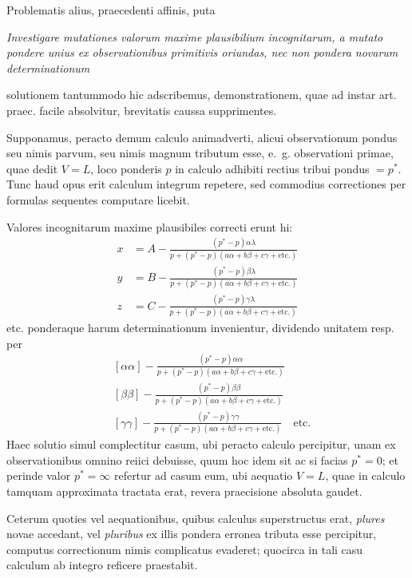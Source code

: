 Problematis alius, praecedenti affinis, puta

\textit{Investigare mutationes valorum maxime plausibilium incognitarum, a mutato pondere unius ex observationibus primitivis oriundas, nec non pondera novarum determinationum}

\noindent solutionem tantummodo hic adscribemus, demonstrationem, quae ad instar art. praec. facile absolvitur, brevitatis caussa supprimentes.

Supponamus, peracto demum calculo animadverti, alicui observationum pondus seu nimis parvum, seu nimis magnum tributum esse, e.\ g. observationi primae, quae dedit \(V=L\), loco ponderis \(p\) in calculo adhibiti rectius tribui pondus \(=p^*\). Tunc haud opus erit calculum integrum repetere, sed commodius correctiones per formulas sequentes computare licebit.

%
Valores incognitarum maxime plausibiles correcti erunt hi:
\[
\begin{aligned}
x&=A-\frac{(p^*-p)\alpha\lambda}{p+(p^*-p)(a\alpha+b\beta+c\gamma+\text{etc.})}\\[7pt]
y&=B-\frac{(p^*-p)\beta\lambda}{p+(p^*-p)(a\alpha+b\beta+c\gamma+\text{etc.})}\\[7pt]
z&=C-\frac{(p^*-p)\gamma\lambda}{p+(p^*-p)(a\alpha+b\beta+c\gamma+\text{etc.})}
\end{aligned}
\]
etc. ponderaque harum determinationum invenientur, dividendo unitatem resp. per
\[
\begin{aligned}
&[\alpha\alpha]-\frac{(p^*-p)\alpha\alpha}{p+(p^*-p)(a\alpha+b\beta+c\gamma+\text{etc.})}\\[7pt]
&[\beta\beta]-\frac{(p^*-p)\beta\beta}{p+(p^*-p)(a\alpha+b\beta+c\gamma+\text{etc.})}\\[7pt]
&[\gamma\gamma]-\frac{(p^*-p)\gamma\gamma}{p+(p^*-p)(a\alpha+b\beta+c\gamma+\text{etc.})}\quad\text{etc.}
\end{aligned}
\]
Haec solutio simul complectitur casum, ubi peracto calculo percipitur, unam ex observationibus omnino reiici debuisse, quum hoc idem sit ac si facias \(p^*=0\); et perinde valor \(p^*=\infty\) refertur ad casum eum, ubi aequatio \(V=L\), quae in calculo tamquam approximata tractata erat, revera praecisione absoluta gaudet.

Ceterum quoties vel aequationibus, quibus calculus superstructus erat, \textit{plures} novae accedant, vel \textit{pluribus} ex illis pondera erronea tributa esse percipitur, computus correctionum nimis complicatus evaderet; quocirca in tali casu calculum ab integro reficere praestabit.

